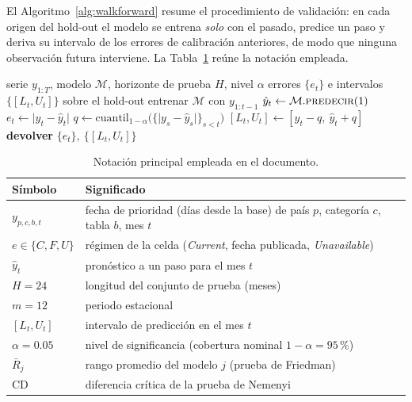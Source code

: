 \documentclass[12pt,letterpaper]{report}
\begin{document}
El Algoritmo~\ref{alg:walkforward} resume el procedimiento de validación: en cada origen del
hold-out el modelo se entrena \textit{solo} con el pasado, predice un paso y deriva su
intervalo de los errores de calibración anteriores, de modo que ninguna observación futura
interviene. La Tabla~\ref{tab:notacion} reúne la notación empleada.

\begin{algorithm}[H]
\caption{Validación \textit{walk-forward} sin fuga con intervalo de predicción conforme}
\label{alg:walkforward}
\begin{algorithmic}[1]
\Require serie $y_{1:T}$, modelo $\mathcal{M}$, horizonte de prueba $H$, nivel $\alpha$
\Ensure errores $\{e_t\}$ e intervalos $\{[L_t,U_t]\}$ sobre el hold-out
  \State entrenar $\mathcal{M}$ con $y_{1:t-1}$ 
  \State $\hat{y}_t \gets \mathcal{M}.\textsc{predecir}(1)$
  \State $e_t \gets \lvert y_t - \hat{y}_t\rvert$
  \State $q \gets \mathrm{cuantil}_{1-\alpha}\bigl(\{\lvert y_s-\hat{y}_s\rvert\}_{s<t}\bigr)$ 
  \State $[L_t,U_t] \gets [\hat{y}_t - q,\ \hat{y}_t + q]$
\EndFor
\State \textbf{devolver} $\{e_t\},\ \{[L_t,U_t]\}$
\end{algorithmic}
\end{algorithm}

\begin{table}[H]
\centering
\footnotesize
\caption[Notación principal]{Notación principal empleada en el documento.}
\label{tab:notacion}
\begin{tabular}{ll}
\toprule
\rowcolor{uacjblue!15}
\textbf{Símbolo} & \textbf{Significado} \\ \midrule
$y_{p,c,b,t}$ & fecha de prioridad (días desde la base) de país $p$, categoría $c$, tabla $b$, mes $t$ \\
$e \in \{C,F,U\}$ & régimen de la celda (\textit{Current}, fecha publicada, \textit{Unavailable}) \\
$\hat{y}_t$ & pronóstico a un paso para el mes $t$ \\
$H=24$ & longitud del conjunto de prueba (meses) \\
$m=12$ & periodo estacional \\
$[L_t,U_t]$ & intervalo de predicción en el mes $t$ \\
$\alpha=0.05$ & nivel de significancia (cobertura nominal $1-\alpha=95$\,\%) \\
$\bar{R}_j$ & rango promedio del modelo $j$ (prueba de Friedman) \\
$\mathrm{CD}$ & diferencia crítica de la prueba de Nemenyi \\
\bottomrule
\end{tabular}
\end{table}
\end{document}

